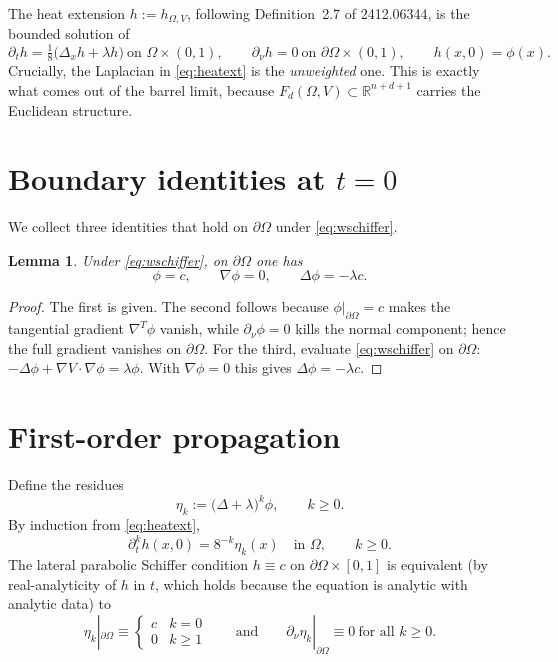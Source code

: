 \documentclass[11pt]{article}
\newcommand{\R}{\mathbb{R}}
\newcommand{\Om}{\Omega}
\newcommand{\1}{\mathbf 1}
\newcommand{\nor}{\partial_\nu}
\newtheorem{lem}{Lemma}
\begin{document}
The heat extension $h:=h_{\Om,V}$, following Definition~2.7 of
2412.06344, is the bounded solution of
\begin{equation}
\label{eq:heatext}
    \partial_t h=\tfrac{1}{8}\bigl(\Delta_x h+\lambda h\bigr)
        \ \text{on }\Om\times(0,1),\qquad
    \nor h=0\ \text{on }\partial\Om\times(0,1),\qquad
    h(x,0)=\phi(x).
\end{equation}
Crucially, the Laplacian in \eqref{eq:heatext} is the
\emph{unweighted} one. This is exactly what comes out of the barrel
limit, because $F_d(\Om,V)\subset\R^{n+d+1}$ carries the Euclidean
structure.

\section{Boundary identities at $t=0$}

We collect three identities that hold on $\partial\Om$ under
\eqref{eq:wschiffer}.

\begin{lem}\label{lem:boundary}
Under \eqref{eq:wschiffer}, on $\partial\Om$ one has
\[
    \phi=c,\qquad \nabla\phi=0,\qquad \Delta\phi=-\lambda c.
\]
\end{lem}

\begin{proof}
The first is given. The second follows because $\phi|_{\partial\Om}=c$
makes the tangential gradient $\nabla^T\phi$ vanish, while
$\nor\phi=0$ kills the normal component; hence the full gradient
vanishes on $\partial\Om$. For the third, evaluate
\eqref{eq:wschiffer} on $\partial\Om$:
$
    -\Delta\phi+\nabla V\cdot\nabla\phi=\lambda\phi.
$
With $\nabla\phi=0$ this gives $\Delta\phi=-\lambda c$.
\end{proof}

\section{First-order propagation}

Define the residues
\[
    \eta_k := \bigl(\Delta+\lambda\bigr)^k\phi,\qquad k\ge 0.
\]
By induction from \eqref{eq:heatext},
\begin{equation}
\label{eq:dtkh}
    \partial_t^k h(x,0)=8^{-k}\eta_k(x)
    \quad\text{in }\Om,\qquad k\ge 0.
\end{equation}
The lateral parabolic Schiffer condition $h\equiv c$ on
$\partial\Om\times[0,1]$ is equivalent (by real-analyticity of $h$ in
$t$, which holds because the equation is analytic with analytic data)
to
\begin{equation}
\label{eq:eta-tower}
    \eta_k|_{\partial\Om}\equiv\begin{cases}c & k=0\\[2pt] 0 & k\ge 1\end{cases}
    \qquad\text{and}\qquad
    \nor\eta_k|_{\partial\Om}\equiv 0\ \text{for all }k\ge 0.
\end{equation}
\end{document}
